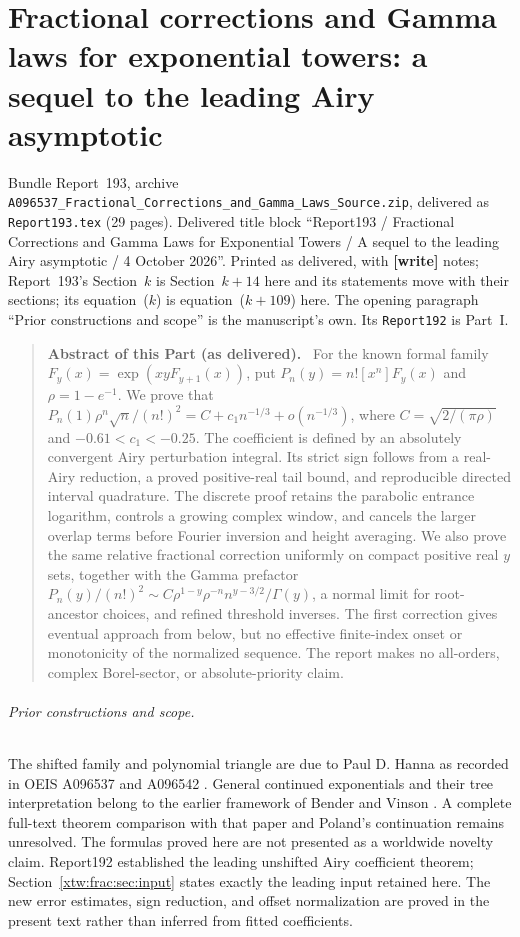 \documentclass[11pt]{article}
\theoremstyle{remark}\newtheorem{remark}[theorem]{Remark}
\newcommand{\file}[1]{\nolinkurl{#1}}
\newenvironment{partabstract}{\begin{quote}\small\noindent\textbf{Abstract of this Part (as delivered).}\ }{\end{quote}}
\newcommand{\partsource}[1]{\par\noindent\begin{minipage}{\textwidth}\small #1\end{minipage}\par\medskip}
\begin{document}
\part{Fractional corrections and Gamma laws for exponential towers: a sequel to the leading Airy asymptotic}\label{xtw:frac:part}
\partsource{Bundle Report~193, archive \file{A096537_Fractional_Corrections_and_Gamma_Laws_Source.zip}, delivered as \file{Report193.tex} (29 pages). Delivered title block ``Report193 / Fractional Corrections and Gamma Laws for Exponential Towers / A sequel to the leading Airy asymptotic / 4 October 2026''. Printed as delivered, with \textbf{[write]} notes; Report~193's Section~$k$ is Section~$k+14$ here and its statements move with their sections; its equation~($k$) is equation~($k+109$) here. The opening paragraph ``Prior constructions and scope'' is the manuscript's own. Its \texttt{Report192} is Part~I.}
\begin{partabstract}
For the known formal family $F_y(x)=\exp(xyF_{y+1}(x))$, put
$P_n(y)=n![x^n]F_y(x)$ and $\rho=1-e^{-1}$. We prove that
$P_n(1)\rho^n\sqrt n/(n!)^2=C+c_1n^{-1/3}+o(n^{-1/3})$, where
$C=\sqrt{2/(\pi\rho)}$ and $-0.61<c_1<-0.25$.
The coefficient is defined by an absolutely convergent Airy perturbation
integral. Its strict sign follows from a real-Airy reduction, a proved
positive-real tail bound, and reproducible directed interval quadrature.
The discrete proof retains the parabolic entrance logarithm, controls a
growing complex window, and cancels the larger overlap terms before Fourier
inversion and height averaging. We also prove the same relative fractional correction uniformly on compact
positive real $y$ sets, together with the Gamma prefactor
$P_n(y)/(n!)^2\sim C\rho^{1-y}\rho^{-n}n^{y-3/2}/\Gamma(y)$,
a normal limit for root-ancestor choices, and refined threshold inverses.
The first correction gives eventual approach from below, but no effective
finite-index onset or monotonicity of the normalized sequence. The report
makes no all-orders, complex Borel-sector, or absolute-priority claim.
\end{partabstract}

\paragraph{Prior constructions and scope.}
The shifted family and polynomial triangle are due to Paul D. Hanna as
recorded in OEIS A096537 and A096542 \cite{oeis537,oeis542}. General continued
exponentials and their tree interpretation belong to the earlier framework
of Bender and Vinson \cite{bv}. A complete full-text theorem comparison with
that paper and Poland's continuation \cite{poland} remains unresolved.
The formulas proved here are not presented as a worldwide novelty claim.
Report192 established the leading unshifted Airy coefficient theorem;
Section~\ref{xtw:frac:sec:input} states exactly the leading input retained here.
The new error estimates, sign reduction, and offset normalization are proved
in the present text rather than inferred from fitted coefficients.
\end{document}
